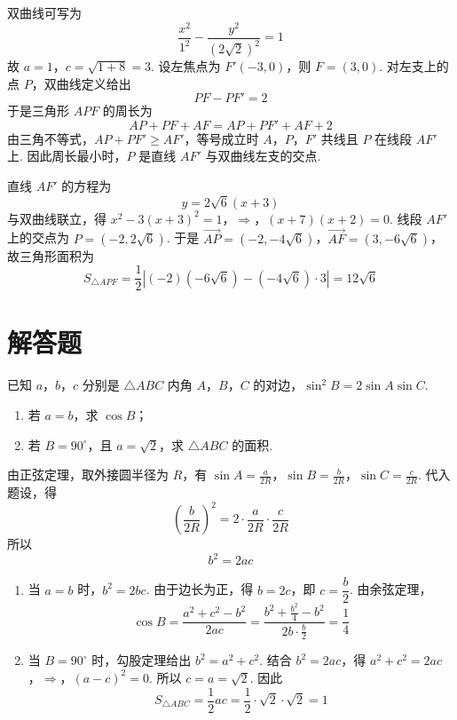 \begin{solution}
双曲线可写为
\[
\frac{x^2}{1^2}-\frac{y^2}{(2\sqrt2)^2}=1
\]
故 \(a=1\)，\(c=\sqrt{1+8}=3\). 设左焦点为 \(F'(-3,0)\)，则 \(F=(3,0)\). 对左支上的点 \(P\)，双曲线定义给出
\[
PF-PF'=2
\]
于是三角形 \(APF\) 的周长为
\[
AP+PF+AF=AP+PF'+AF+2
\]
由三角不等式，\(AP+PF'\geqslant AF'\)，等号成立时 \(A\)，\(P\)，\(F'\) 共线且 \(P\) 在线段 \(AF'\) 上. 因此周长最小时，\(P\) 是直线 \(AF'\) 与双曲线左支的交点.

直线 \(AF'\) 的方程为
\[
y=2\sqrt6(x+3)
\]
与双曲线联立，得
\(x^2-3(x+3)^2=1\)，\(\Longrightarrow\)，\((x+7)(x+2)=0\).
线段 \(AF'\) 上的交点为 \(P=(-2,2\sqrt6)\). 于是
\(\overrightarrow{AP}=(-2,-4\sqrt6)\)，\(\overrightarrow{AF}=(3,-6\sqrt6)\)，
故三角形面积为
\[
S_{\triangle APF}
=\frac12\left|(-2)(-6\sqrt6)-(-4\sqrt6)\cdot3\right|
=12\sqrt6
\]
\end{solution}

\section{解答题}

\begin{problem}
已知 \(a\)，\(b\)，\(c\) 分别是 \(\triangle ABC\) 内角 \(A\)，\(B\)，\(C\) 的对边，\(\sin^{2} B = 2 \sin A \sin C\).

\begin{enumerate}
\item 若 \(a = b\)，求 \( \cos B \)；
\item 若 \(B = 90^{\circ}\)，且 \(a = \sqrt{2}\)，求 \(\triangle ABC\) 的面积.
\end{enumerate}
\end{problem}

\begin{solution}
由正弦定理，取外接圆半径为 \(R\)，有
\(\sin A=\frac{a}{2R}\)，\(\sin B=\frac{b}{2R}\)，\(\sin C=\frac{c}{2R}\).
代入题设，得
\[
\left(\frac{b}{2R}\right)^2
=2\cdot\frac{a}{2R}\cdot\frac{c}{2R}
\]
所以
\[
b^2=2ac
\]

\begin{enumerate}
\item 当 \(a=b\) 时，\(b^2=2bc\). 由于边长为正，得 \(b=2c\)，即 \(c=\dfrac b2\). 由余弦定理，
\[
\cos B=\frac{a^2+c^2-b^2}{2ac}
=\frac{b^2+\frac{b^2}{4}-b^2}{2b\cdot\frac b2}
=\frac14
\]

\item 当 \(B=90^{\circ}\) 时，勾股定理给出 \(b^2=a^2+c^2\). 结合 \(b^2=2ac\)，得
\(a^2+c^2=2ac\)，\(\Longrightarrow\)，\((a-c)^2=0\).
所以 \(c=a=\sqrt2\). 因此
\[
S_{\triangle ABC}=\frac12ac
=\frac12\cdot\sqrt2\cdot\sqrt2=1
\]
\end{enumerate}
\end{solution}

